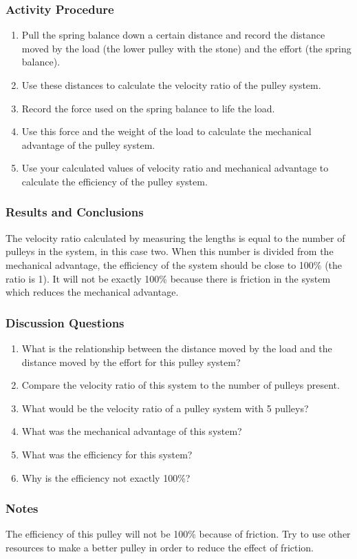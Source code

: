 \subsubsection*{Activity Procedure}
\begin{enumerate}
\item{Pull the spring balance down a certain distance and record the distance moved by the load (the lower pulley with the stone) and the effort (the spring balance).}
\item{Use these distances to calculate the velocity ratio of the pulley system.}
\item{Record the force used on the spring balance to life the load.}
\item{Use this force and the weight of the load to calculate the mechanical advantage of the pulley system.}
\item{Use your calculated values of velocity ratio and mechanical advantage to calculate the efficiency of the pulley system.}
\end{enumerate}

\subsubsection*{Results and Conclusions}
The velocity ratio calculated by measuring the lengths is equal to the number of pulleys in the system, in this case two.  When this number is divided from the mechanical advantage, the efficiency of the system should be close to 100\% (the ratio is 1).  It will not be exactly 100\% because there is friction in the system which reduces the mechanical advantage.


\subsubsection*{Discussion Questions}
\begin{enumerate}
\item{What is the relationship between the distance moved by the load and the distance moved by the effort for this pulley system?}
\item{Compare the velocity ratio of this system to the number of pulleys present.}
\item{What would be the velocity ratio of a pulley system with 5 pulleys?}
\item{What was the mechanical advantage of this system?}
\item{What was the efficiency for this system?}
\item{Why is the efficiency not exactly 100\%?}
\end{enumerate}

\subsubsection*{Notes}
The efficiency of this pulley will not be 100\% because of friction.  Try to use other resources to make a better pulley in order to reduce the effect of friction.
